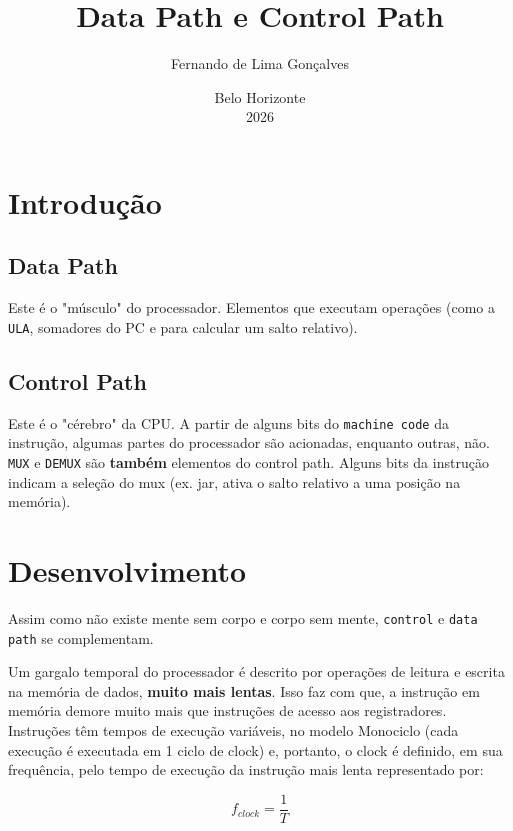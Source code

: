 \documentclass[12pt,titlepage,a4paper]{article}
\title{Data Path e Control Path}
\author{Fernando de Lima Gonçalves}
\date{Belo Horizonte\\2026}
\begin{document}
\maketitle
\tableofcontents

\section{Introdução}
\subsection{Data Path}
Este é o "músculo" do processador.
Elementos que executam operações (como a \texttt{ULA}, somadores do PC e para calcular um salto relativo).

\subsection{Control Path}
Este é o "cérebro" da CPU.
A partir de alguns bits do \texttt{machine code} da instrução, algumas partes do processador são acionadas, enquanto outras, não.
\texttt{MUX} e \texttt{DEMUX} são \textbf{também} elementos do control path.
Alguns bits da instrução indicam a seleção do mux (ex. jar, ativa o salto relativo a uma posição na memória).

\section{Desenvolvimento}
Assim como não existe mente sem corpo e corpo sem mente, \texttt{control} e \texttt{data path} se complementam.

Um gargalo temporal do processador é descrito por operações de leitura e escrita na memória de dados,
\textbf{muito mais lentas}. Isso faz com que, a instrução em memória demore muito mais que instruções de acesso aos registradores.
Instruções têm tempos de execução variáveis, no modelo Monociclo (cada execução é executada em 1 ciclo de clock) e, portanto,
o clock é definido, em sua frequência, pelo tempo de execução da instrução mais lenta representado por:
\begin{center}
    \large
    \[
        \boxed{f_{clock} = \frac{1}{T}}
    \]
\end{center}
\end{document}
